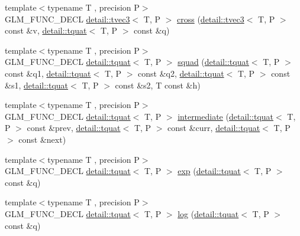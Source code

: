 \begin{DoxyCompactItemize}
\item 
{\footnotesize template$<$typename T , precision P$>$ }\\G\+L\+M\+\_\+\+F\+U\+N\+C\+\_\+\+D\+E\+CL \hyperlink{structglm_1_1detail_1_1tvec3}{detail\+::tvec3}$<$ T, P $>$ \hyperlink{group__gtx__quaternion_ga7794f940ba271ff846ea706204b0259a}{cross} (\hyperlink{structglm_1_1detail_1_1tvec3}{detail\+::tvec3}$<$ T, P $>$ const \&v, \hyperlink{structglm_1_1detail_1_1tquat}{detail\+::tquat}$<$ T, P $>$ const \&q)
\item 
{\footnotesize template$<$typename T , precision P$>$ }\\G\+L\+M\+\_\+\+F\+U\+N\+C\+\_\+\+D\+E\+CL \hyperlink{structglm_1_1detail_1_1tquat}{detail\+::tquat}$<$ T, P $>$ \hyperlink{group__gtx__quaternion_ga5e756a5817856a3d69f0974fac8322e2}{squad} (\hyperlink{structglm_1_1detail_1_1tquat}{detail\+::tquat}$<$ T, P $>$ const \&q1, \hyperlink{structglm_1_1detail_1_1tquat}{detail\+::tquat}$<$ T, P $>$ const \&q2, \hyperlink{structglm_1_1detail_1_1tquat}{detail\+::tquat}$<$ T, P $>$ const \&s1, \hyperlink{structglm_1_1detail_1_1tquat}{detail\+::tquat}$<$ T, P $>$ const \&s2, T const \&h)
\item 
{\footnotesize template$<$typename T , precision P$>$ }\\G\+L\+M\+\_\+\+F\+U\+N\+C\+\_\+\+D\+E\+CL \hyperlink{structglm_1_1detail_1_1tquat}{detail\+::tquat}$<$ T, P $>$ \hyperlink{group__gtx__quaternion_ga96cb50103d939ea50d8b80bc898b2a35}{intermediate} (\hyperlink{structglm_1_1detail_1_1tquat}{detail\+::tquat}$<$ T, P $>$ const \&prev, \hyperlink{structglm_1_1detail_1_1tquat}{detail\+::tquat}$<$ T, P $>$ const \&curr, \hyperlink{structglm_1_1detail_1_1tquat}{detail\+::tquat}$<$ T, P $>$ const \&next)
\item 
{\footnotesize template$<$typename T , precision P$>$ }\\G\+L\+M\+\_\+\+F\+U\+N\+C\+\_\+\+D\+E\+CL \hyperlink{structglm_1_1detail_1_1tquat}{detail\+::tquat}$<$ T, P $>$ \hyperlink{group__gtx__quaternion_gaadebfad5c8b4b3dde114915f0494b739}{exp} (\hyperlink{structglm_1_1detail_1_1tquat}{detail\+::tquat}$<$ T, P $>$ const \&q)
\item 
{\footnotesize template$<$typename T , precision P$>$ }\\G\+L\+M\+\_\+\+F\+U\+N\+C\+\_\+\+D\+E\+CL \hyperlink{structglm_1_1detail_1_1tquat}{detail\+::tquat}$<$ T, P $>$ \hyperlink{group__gtx__quaternion_ga832e6b69f9e5f596cad8bada9ebb4477}{log} (\hyperlink{structglm_1_1detail_1_1tquat}{detail\+::tquat}$<$ T, P $>$ const \&q)
\item 

\end{DoxyCompactItemize}
